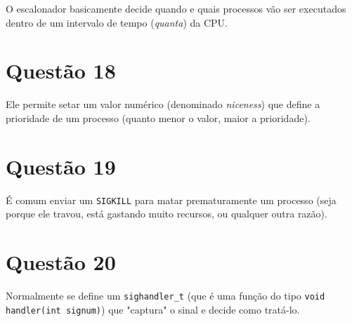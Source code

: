 \documentclass{article}
\begin{document}
O escalonador basicamente decide quando e quais processos vão ser executados dentro de um intervalo de tempo (\textit{quanta}) da CPU.

\section*{Questão 18}

Ele permite setar um valor numérico (denominado \textit{niceness}) que define a prioridade de um processo (quanto menor o valor, maior a prioridade).

\section*{Questão 19}

É comum enviar um \texttt{SIGKILL} para matar prematuramente um processo (seja porque ele travou, está gastando muito recursos, ou qualquer outra razão).

\section*{Questão 20}

Normalmente se define um \texttt{sighandler\_t} (que é uma função do tipo \texttt{void handler(int signum)}) que "captura" o sinal e decide como tratá-lo.
\end{document}
